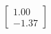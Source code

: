 \documentclass[preview]{standalone}
\begin{document}
\begin{align*}
\begin{bmatrix} 1.00 \\ -1.37 \end{bmatrix}
\end{align*}
\end{document}
